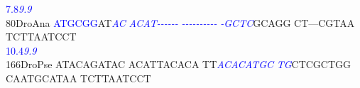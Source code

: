 \documentclass[11pt,twoside,reqno,a4paper]{article}
\begin{document}
{\hspace*{4\charwidth}\hspace*{7\charwidth}\hspace*{0\charwidth}\textcolor{blue}{7.8}\hspace*{5\charwidth}\textit{\textcolor{blue}{9.9}}\hspace*{1\charwidth}\hspace*{1\charwidth}\hspace*{1\charwidth}\hspace*{1\charwidth}\hspace*{1\charwidth}\hspace*{1\charwidth}\\
80\hspace*{2\charwidth}DroAna	\textcolor{blue}{A}\textcolor{blue}{T}\textcolor{blue}{G}\textcolor{blue}{C}\textcolor{blue}{G}\textcolor{blue}{G}AT\textit{\textcolor{blue}{A}}\textit{\textcolor{blue}{C}}	\textit{\textcolor{blue}{A}}\textit{\textcolor{blue}{C}}\textit{\textcolor{blue}{A}}\textit{\textcolor{blue}{T}}\textit{\textcolor{blue}{-}}\textit{\textcolor{blue}{-}}\textit{\textcolor{blue}{-}}\textit{\textcolor{blue}{-}}\textit{\textcolor{blue}{-}}\textit{\textcolor{blue}{-}}	\textit{\textcolor{blue}{-}}\textit{\textcolor{blue}{-}}\textit{\textcolor{blue}{-}}\textit{\textcolor{blue}{-}}\textit{\textcolor{blue}{-}}\textit{\textcolor{blue}{-}}\textit{\textcolor{blue}{-}}\textit{\textcolor{blue}{-}}\textit{\textcolor{blue}{-}}\textit{\textcolor{blue}{-}}	\textit{\textcolor{blue}{-}}\textit{\textcolor{blue}{G}}\textit{\textcolor{blue}{C}}\textit{\textcolor{blue}{T}}\textit{\textcolor{blue}{C}}GCAGG	CT---CGTAA	TCTTAATCCT	\\
\hspace*{4\charwidth}\hspace*{7\charwidth}\hspace*{0\charwidth}\textcolor{blue}{10.4}\hspace*{4\charwidth}\textit{\textcolor{blue}{9.9}}\hspace*{1\charwidth}\hspace*{1\charwidth}\hspace*{1\charwidth}\hspace*{1\charwidth}\hspace*{1\charwidth}\hspace*{1\charwidth}\\
166\hspace*{1\charwidth}DroPse	ATACAGATAC	ACATTACACA	TT\textit{\textcolor{blue}{A}}\textit{\textcolor{blue}{C}}\textit{\textcolor{blue}{A}}\textit{\textcolor{blue}{C}}\textit{\textcolor{blue}{A}}\textit{\textcolor{blue}{T}}\textit{\textcolor{blue}{G}}\textit{\textcolor{blue}{C}}	\textit{\textcolor{blue}{T}}\textit{\textcolor{blue}{G}}CTCGCTGG	CAATGCATAA	TCTTAATCCT	\\
}
\end{document}
